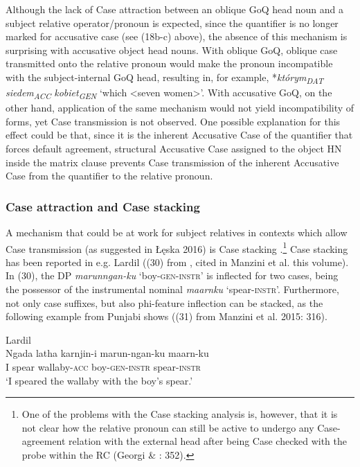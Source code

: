 \documentclass[output=paper]{langsci/langscibook}
\begin{document}
Although the lack of Case attraction between an oblique GoQ head noun and a subject relative operator/pronoun is expected, since the quantifier is no longer marked for accusative case (see (18b-c) above), the absence of this mechanism is surprising with accusative object head nouns. With oblique GoQ, oblique case transmitted onto the relative pronoun would make the pronoun incompatible with the subject-internal GoQ head, resulting in, for example, *\textit{którym\textsubscript{DAT}} \textit{siedem\textsubscript{ACC}} \textit{kobiet\textsubscript{GEN}} ‘which <seven women>’. With accusative GoQ, on the other hand, application of the same mechanism would not yield incompatibility of forms, yet Case transmission is not observed. One possible explanation for this effect could be that, since it is the inherent Accusative Case of the quantifier that forces default agreement, structural Accusative Case assigned to the object HN inside the matrix clause prevents Case transmission of the inherent Accusative Case from the quantifier to the relative pronoun. 

\subsubsection{Case attraction and Case stacking}%

A mechanism that could be at work for subject relatives in contexts which allow Case transmission (as suggested in Łęska 2016) is Case stacking \citep{Vogel2001}.\footnote{One of the problems with the Case stacking analysis is, however, that it is not clear how the relative pronoun can still be active to undergo any Case-agreement relation with the external head after being Case checked with the probe within the RC (Georgi \& \citealt{Salzmann2014}: 352).} Case stacking has been reported in e.g. Lardil ((30) from \citealt{Richards2013}, cited in Manzini et al. this volume). In (30), the DP \textit{marunngan-ku} ‘boy-\textsc{gen-instr}’ is inflected for two cases, being the possessor of the instrumental nominal \textit{maarnku} ‘spear\textsc{{}-instr}’. Furthermore, not only case suffixes, but also phi-feature inflection can be stacked, as the following example from Punjabi shows ((31) from Manzini et al. 2015: 316). 

\ea%
         Lardil\label{ex:leska:30}\\
    \gll Ngada   latha   karnjin-i   marun-ngan-ku   maarn-ku   \\
         I     spear   wallaby-\textsc{acc} boy-\textsc{gen-instr}   spear-\textsc{instr}\\
    \glt ‘I speared the wallaby with the boy’s spear.’
    \z
\end{document}
